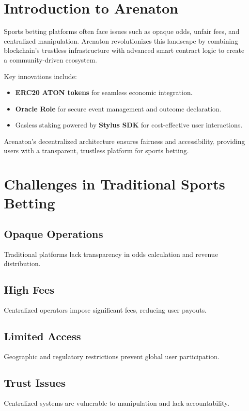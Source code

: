 \documentclass[9pt]{article}
\begin{document}
	\setlength{\columnsep}{0.5cm} %
	\begin{multicols}{2}
		
		\section{Introduction to Arenaton}
		Sports betting platforms often face issues such as opaque odds, unfair fees, and centralized manipulation. Arenaton revolutionizes this landscape by combining blockchain’s trustless infrastructure with advanced smart contract logic to create a community-driven ecosystem.
		
		Key innovations include:
		\begin{itemize}
			\item \textbf{ERC20 ATON tokens} for seamless economic integration.
			\item \textbf{Oracle Role} for secure event management and outcome declaration.
			\item Gasless staking powered by \textbf{Stylus SDK} for cost-effective user interactions.
		\end{itemize}
		Arenaton’s decentralized architecture ensures fairness and accessibility, providing users with a transparent, trustless platform for sports betting.
		
		\section{Challenges in Traditional Sports Betting}
		\subsection{Opaque Operations}
		Traditional platforms lack transparency in odds calculation and revenue distribution.
		
		\subsection{High Fees}
		Centralized operators impose significant fees, reducing user payouts.
		
		\subsection{Limited Access}
		Geographic and regulatory restrictions prevent global user participation.
		
		\subsection{Trust Issues}
		Centralized systems are vulnerable to manipulation and lack accountability.
		

\end{multicols}
\end{document}
